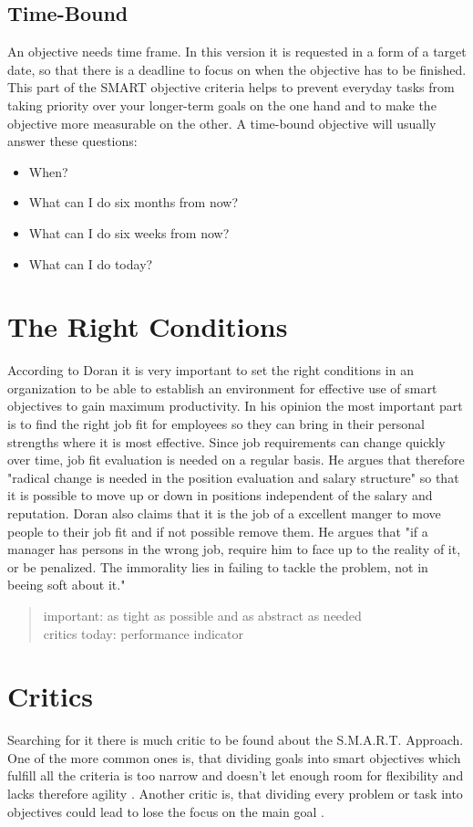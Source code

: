 \documentclass[11pt,a4paper]{article}
\begin{document}
\subsection*{Time-Bound}
An objective needs time frame. In this version it is requested in a form of a
target date, so that there is a deadline to focus on when the objective has to
be finished. This part of the SMART objective criteria helps to prevent
everyday tasks from taking priority over your longer-term goals on the one
hand and to make the objective more measurable on the other. A time-bound
objective will usually answer these questions:
\begin{itemize}
\item When?
\item What can I do six months from now?
\item What can I do six weeks from now?
\item What can I do today?
\end{itemize}

\section{The Right Conditions}
According to Doran \cite{doran1981there} it is very important to set the right
conditions in an organization to be able to establish an environment for
effective use of smart objectives to gain maximum productivity. In his opinion
the most important part is to find the right job fit for employees so they can
bring in their personal strengths where it is most effective. Since job
requirements can change quickly over time, job fit evaluation is needed on a
regular basis. He argues that therefore "radical change is needed in the
position evaluation and salary structure" so that it is possible to move up or
down in positions independent of the salary and reputation. Doran also claims
that it is the job of a excellent manger to move people to their job fit and
if not possible remove them. He argues that "if a manager has persons in the
wrong job, require him to face up to the reality of it, or be penalized. The
immorality lies in failing to tackle the problem, not in beeing soft about
it."

\begin{quote}
  important: as tight as possible and as abstract as needed\\
  critics today: performance indicator
\end{quote}

\section{Critics}
Searching for it there is much critic to be found about the
S.M.A.R.T. Approach. One of the more common ones is, that dividing goals into
smart objectives which fulfill all the criteria is too narrow and doesn't let
enough room for flexibility and lacks therefore agility
\cite{whysmartdoesnotwork, 6reasonswhy, fastgoals}. Another critic is, that
dividing every problem or task into objectives could lead to lose the focus on
the main goal \cite{6reasonswhy}.
\end{document}
